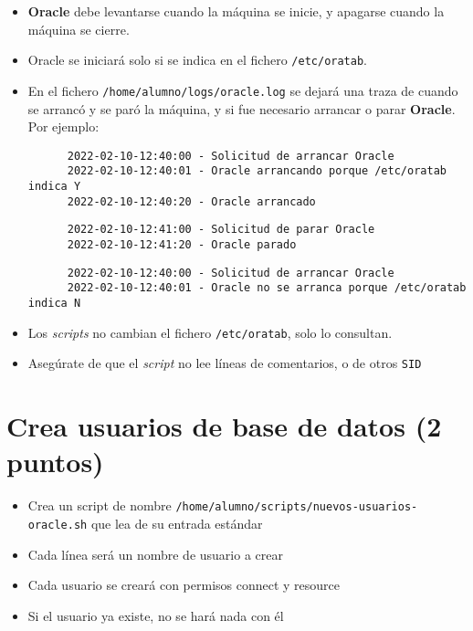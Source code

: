 \documentclass{article}
\begin{document}
\begin{itemize}
\item \textbf{Oracle} debe levantarse cuando la máquina se inicie, y apagarse cuando la máquina se cierre.
\item Oracle se iniciará solo si se indica en el fichero \texttt{/etc/oratab}.

\item En el fichero \texttt{/home/alumno/logs/oracle.log} se dejará una traza de cuando se arrancó y se paró la máquina, y si fue necesario arrancar o parar \textbf{Oracle}. Por ejemplo:

\begin{lstlisting}
      2022-02-10-12:40:00 - Solicitud de arrancar Oracle
      2022-02-10-12:40:01 - Oracle arrancando porque /etc/oratab indica Y
      2022-02-10-12:40:20 - Oracle arrancado
\end{lstlisting}

\begin{lstlisting}
      2022-02-10-12:41:00 - Solicitud de parar Oracle
      2022-02-10-12:41:20 - Oracle parado
\end{lstlisting}

\begin{lstlisting}
      2022-02-10-12:40:00 - Solicitud de arrancar Oracle
      2022-02-10-12:40:01 - Oracle no se arranca porque /etc/oratab indica N
\end{lstlisting}
\end{itemize}


\begin{Aviso}
\begin{itemize}
\item Los \emph{scripts} no cambian el fichero \texttt{/etc/oratab}, solo lo consultan.
\item Asegúrate de que el \emph{script} no lee líneas de comentarios, o de otros \texttt{SID}
\end{itemize}
\end{Aviso}


\section{Crea usuarios de base de datos (2 puntos)}
\label{sec:org0000006}
\begin{itemize}
\item Crea un script de nombre \texttt{/home/alumno/scripts/nuevos-usuarios-oracle.sh} que lea de su entrada estándar
\item Cada línea será un nombre de usuario a crear
\item Cada usuario se creará con permisos connect y resource
\item Si el usuario ya existe, no se hará nada con él
\end{itemize}
\end{document}
